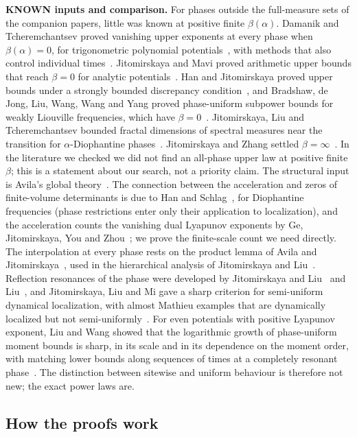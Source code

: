 \textbf{KNOWN inputs and comparison.} For phases outside the full-measure sets of the companion papers, little was known at positive finite $\beta(\alpha)$. Damanik and Tcheremchantsev proved vanishing upper exponents at every phase when $\beta(\alpha)=0$, for trigonometric polynomial potentials~\cite[Theorems~4--5]{DT2007}, with methods that also control individual times~\cite{DT2008}. Jitomirskaya and Mavi proved arithmetic upper bounds that reach $\beta=0$ for analytic potentials~\cite[Theorem~1.7 and Remark~1.12]{JitomirskayaMavi2017}. Han and Jitomirskaya proved upper bounds under a strongly bounded discrepancy condition~\cite{HanJitomirskaya2019}, and Bradshaw, de Jong, Liu, Wang, Wang and Yang proved phase-uniform subpower bounds for weakly Liouville frequencies, which have $\beta=0$~\cite{BdJLWWY2025}. Jitomirskaya, Liu and Tcheremchantsev bounded fractal dimensions of spectral measures near the transition for $\alpha$-Diophantine phases~\cite{JLT2025}. Jitomirskaya and Zhang settled $\beta=\infty$~\cite{JZ2022}. In the literature we checked we did not find an all-phase upper law at positive finite $\beta$; this is a statement about our search, not a priority claim. The structural input is Avila's global theory~\cite{Avila2015}. The connection between the acceleration and zeros of finite-volume determinants is due to Han and Schlag~\cite{HanSchlag2022}, for Diophantine frequencies (phase restrictions enter only their application to localization), and the acceleration counts the vanishing dual Lyapunov exponents by Ge, Jitomirskaya, You and Zhou~\cite{GJYZ2023}; we prove the finite-scale count we need directly. The interpolation at every phase rests on the product lemma of Avila and Jitomirskaya~\cite[Lemma~9.7]{AJ2009}, used in the hierarchical analysis of Jitomirskaya and Liu~\cite{JL2018}. Reflection resonances of the phase were developed by Jitomirskaya and Liu~\cite{JLphase} and Liu~\cite{Liu2022}, and Jitomirskaya, Liu and Mi gave a sharp criterion for semi-uniform dynamical localization, with almost Mathieu examples that are dynamically localized but not semi-uniformly~\cite{JLM2024}. For even potentials with positive Lyapunov exponent, Liu and Wang showed that the logarithmic growth of phase-uniform moment bounds is sharp, in its scale and in its dependence on the moment order, with matching lower bounds along sequences of times at a completely resonant phase~\cite{LiuWang2026}. The distinction between sitewise and uniform behaviour is therefore not new; the exact power laws are.

\subsection{How the proofs work}

